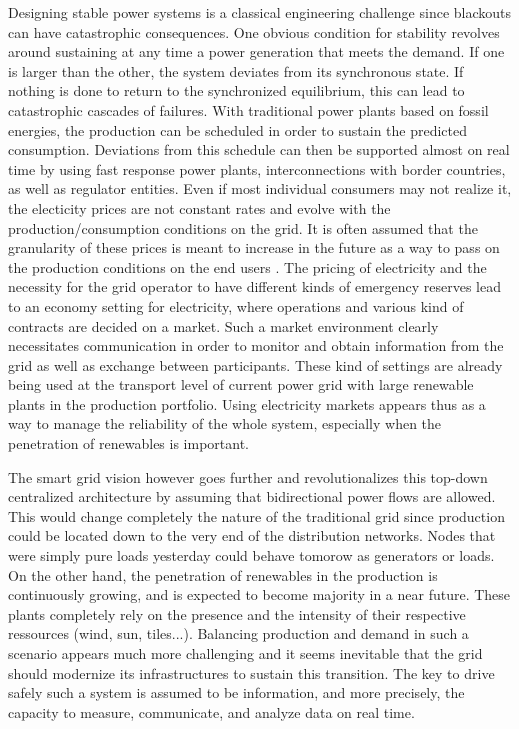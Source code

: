 \documentclass[conference]{IEEEtran}
\begin{document}
Designing stable power systems is a classical engineering challenge since blackouts can have catastrophic consequences. One obvious condition for stability revolves around sustaining at any time a power generation that meets the demand. If one is larger than the other, the system deviates from its synchronous state. If nothing is done to return to the synchronized equilibrium, this can lead to catastrophic cascades of failures. With traditional power plants based on fossil energies, the production can be scheduled in order to sustain the predicted consumption. Deviations from this schedule can then be supported almost on real time by using fast response power plants, interconnections with border countries, as well as regulator entities. Even if most individual consumers may not realize it, the electicity prices are not constant rates and evolve with the production/consumption conditions on the grid. It is often assumed that the granularity of these prices is meant to increase in the future as a way to pass on the production conditions on the end users \cite{Jiang2014}. The pricing of electricity and the necessity for the grid operator to have different kinds of emergency reserves lead to an economy setting for electricity, where operations and various kind of contracts are decided on a market. Such a market environment clearly necessitates communication in order to monitor and obtain information from the grid as well as exchange between participants. These kind of settings are already being used at the transport level of current power grid with large renewable plants in the production portfolio. Using electricity markets appears thus as a way to manage the reliability of the whole system, especially when the penetration of renewables is important.

The smart grid vision however goes further and revolutionalizes this top-down centralized architecture by assuming that bidirectional power flows are allowed. This would change completely the nature of the traditional grid since production could be located down to the very end of the distribution networks. Nodes that were simply pure loads yesterday could behave tomorow as generators or loads. On the other hand, the penetration of renewables in the production is continuously growing, and is expected to become majority in a near future. These plants completely rely on the presence and the intensity of their respective ressources (wind, sun, tiles...). Balancing production and demand in such a scenario appears much more challenging and it seems inevitable that the grid should modernize its infrastructures to sustain this transition. The key to drive safely such a system is assumed to be information, and more precisely, the capacity to measure, communicate, and analyze data on real time.
\end{document}
